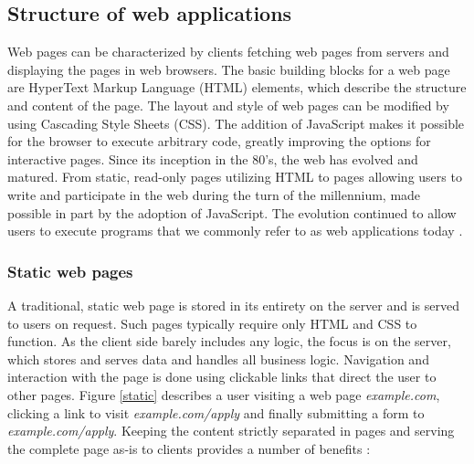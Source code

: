 \clearpage
\subsection{Structure of web applications}
\label{sec:background-structure}

Web pages can be characterized by clients fetching web pages from servers and displaying the pages in web browsers. The basic building blocks for a web page are HyperText Markup Language (HTML) elements, which describe the structure and content of the page. The layout and style of web pages can be modified by using Cascading Style Sheets (CSS). The addition of JavaScript makes it possible for the browser to execute arbitrary code, greatly improving the options for interactive pages. 
Since its inception in the 80's, the web has evolved and matured. From static, read-only pages utilizing HTML to pages allowing users to write and participate in the web during the turn of the millennium, made possible in part by the adoption of JavaScript. The evolution continued to allow users to execute programs that we commonly refer to as web applications today \citep{jacksi_development_2019}. 


\subsubsection{Static web pages}
A traditional, static web page is stored in its entirety on the server and is served to users on request. 
Such pages typically require only HTML and CSS to function.
As the client side barely includes any logic, the focus is on the server, which stores and serves data and handles all business logic.
Navigation and interaction with the page is done using clickable links that direct the user to other pages.
Figure \ref{static} describes a user visiting a web page \textit{example.com}, clicking a link to visit \textit{example.com/apply} and finally submitting a form to \textit{example.com/apply}.
Keeping the content strictly separated in pages and serving the complete page as-is to clients provides a number of benefits \citep{camden_why_nodate}:

